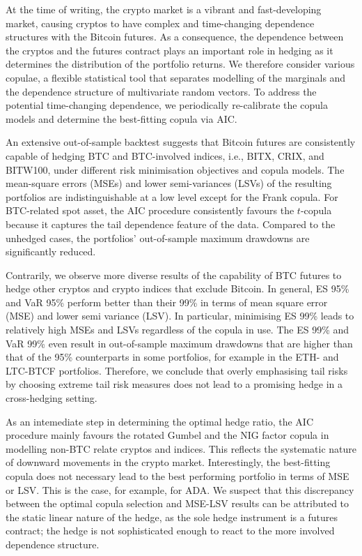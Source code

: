 \documentclass[11pt,a4paper,english]{article}
\begin{document}
At the time of writing, the crypto market is a vibrant and
fast-developing market, causing cryptos to have complex and
time-changing dependence structures with the Bitcoin futures.
As a consequence, the dependence between the cryptos and the futures
contract plays an important role in hedging as it determines the
distribution of the portfolio returns. We therefore consider various
copulae, a flexible statistical tool that separates modelling of the
marginals and the dependence structure of multivariate random
vectors. To address the potential time-changing dependence, we
periodically re-calibrate the copula models and determine the
best-fitting copula via AIC. 

An extensive out-of-sample backtest suggests that Bitcoin futures
are consistently capable of hedging BTC and BTC-involved indices,
i.e., BITX, CRIX, and BITW100, under different risk minimisation
objectives 
and copula models. The mean-square errors (MSEs) and lower
semi-variances (LSVs) of the resulting portfolios are
indistinguishable at a low level except for the Frank copula. 
For BTC-related spot asset, the AIC procedure consistently
favours the $t$-copula because it  
captures the tail dependence feature of the data. 
Compared to the unhedged cases, the
portfolios' out-of-sample maximum drawdowns are significantly reduced. 

Contrarily, we observe more diverse results of the capability of BTC
futures to hedge other cryptos and crypto indices that exclude Bitcoin. 
In general, ES 95\% and VaR 95\% perform better than their 99\%
in terms of mean square error (MSE) and lower semi variance (LSV).
In particular, minimising ES 99\% leads to relatively
high MSEs and LSVs regardless of the copula in use. The ES 99\% and
VaR 99\% even result in out-of-sample maximum drawdowns that are
higher than that of the 95\% counterparts in some portfolios, 
for example in the ETH- and LTC-BTCF portfolios.
Therefore, we conclude that overly emphasising tail risks by choosing
extreme tail risk measures does not lead to a promising hedge in a
cross-hedging setting. 

As an intemediate step in determining the optimal hedge ratio, 
the AIC procedure mainly favours the rotated Gumbel and the NIG
factor copula in modelling non-BTC relate cryptos and indices. This
reflects the systematic nature of 
downward movements in the crypto market. Interestingly, the best-fitting
copula does not necessary lead to the best performing portfolio in
terms of MSE or LSV. This is the case, for example, for ADA. 
We suspect that this discrepancy between the optimal copula selection and
MSE-LSV results can be attributed to the static linear nature of the
hedge, as the sole hedge instrument is a futures contract; the
hedge is not sophisticated enough to react to the more involved
dependence structure.
\end{document}

